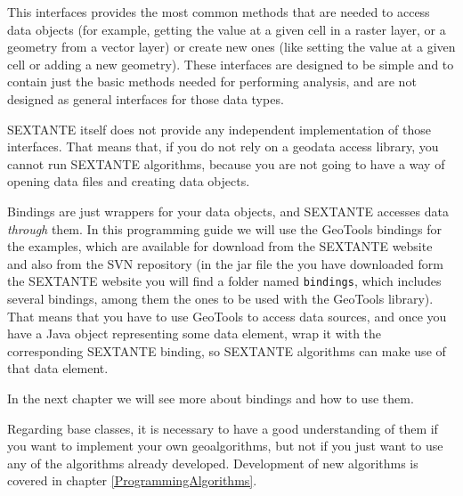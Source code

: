 This interfaces provides the most common methods that are needed to access data objects (for example, getting the value at a given cell in a raster layer, or a geometry from a vector layer) or create new ones (like setting the value at a given cell or adding a new geometry). These interfaces are designed to be simple and to contain just the basic methods needed for performing analysis, and are not designed as general interfaces for those data types.

SEXTANTE itself does not provide any independent implementation of those interfaces. That means that, if you do not rely on a geodata access library, you cannot run SEXTANTE algorithms, because you are not going to have a way of opening data files and creating data objects.

Bindings are just wrappers for your data objects, and SEXTANTE accesses data \emph{through} them. In this programming guide we will use the GeoTools bindings for the examples, which are available for download from the SEXTANTE website and also from the SVN repository (in the jar file the you have downloaded form the SEXTANTE website you will find a folder named \texttt{bindings}, which includes several bindings, among them the ones to be used with the GeoTools library). That means that you have to use GeoTools to access data sources, and once you have a Java object representing some data element, wrap it with the corresponding SEXTANTE binding, so SEXTANTE algorithms can make use of that data element.

In the next chapter we will see more about bindings and how to use them.

Regarding base classes, it is necessary to have a good understanding of them if you want to implement your own geoalgorithms, but not if you just want to use any of the algorithms already developed. Development of new algorithms is covered in chapter \ref{ProgrammingAlgorithms}.

